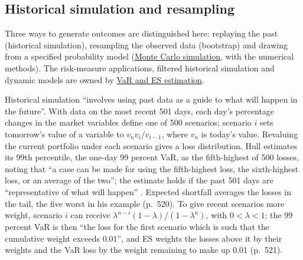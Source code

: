 \subsection{Historical simulation and resampling}

Three ways to generate outcomes are distinguished here: replaying the past (historical simulation), resampling the observed data (bootstrap) and drawing from a specified probability model (\hyperref[meth:monte-carlo-simulation]{Monte Carlo simulation}, with the numerical methods). The risk-measure applications, filtered historical simulation and dynamic models are owned by \hyperref[meth:var-es-estimation-methods]{VaR and ES estimation}.

\begin{qfmethod}\label{meth:historical-simulation}
 Historical simulation ``involves using past data as a guide to what will happen in the future''. With data on the most recent 501 days, each day's percentage changes in the market variables define one of 500 scenarios; scenario $i$ sets tomorrow's value of a variable to $v_n v_i/v_{i-1}$, where $v_n$ is today's value. Revaluing the current portfolio under each scenario gives a loss distribution. Hull estimates its 99th percentile, the one-day 99 percent VaR, as the fifth-highest of 500 losses, noting that ``a case can be made for using the fifth-highest loss, the sixth-highest loss, or an average of the two''; the estimate holds if the past 501 days are ``representative of what will happen'' \citep[chap.~22, sec.~22.2, p.~517 and n.~2]{s7-hulloptions}. Expected shortfall averages the losses in the tail, the five worst in his example (p.~520). To give recent scenarios more weight, scenario $i$ can receive $\lambda^{n-i}(1-\lambda)/(1-\lambda^n)$, with $0<\lambda<1$; the 99 percent VaR is then ``the loss for the first scenario which is such that the cumulative weight exceeds 0.01'', and ES weights the losses above it by their weights and the VaR loss by the weight remaining to make up 0.01 (p.~521).


\end{qfmethod}
